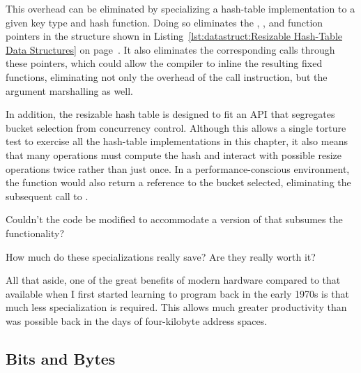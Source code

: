 This overhead can be eliminated by specializing a hash-table implementation
to a given key type and hash function.
Doing so eliminates the , , and
 function pointers in the  structure shown in
Listing~\ref{lst:datastruct:Resizable Hash-Table Data Structures} on
page~\pageref{lst:datastruct:Resizable Hash-Table Data Structures}.
It also eliminates the corresponding calls through these pointers,
which could allow the compiler to inline the resulting fixed functions,
eliminating not only the overhead of the call instruction, but the
argument marshalling as well.

In addition, the resizable hash table is designed to fit an API
that segregates bucket selection from concurrency control.
Although this allows a single torture test to exercise all the hash-table
implementations in this chapter, it also means that many operations
must compute the hash and interact with possible resize operations twice
rather than just once.
In a performance-conscious environment, the 
function would also return a reference to the bucket selected, eliminating
the subsequent call to .

\QuickQuiz{}
	Couldn't the  code be modified to accommodate
	a version of  that subsumes the
	 functionality?
 \QuickQuizEnd

\QuickQuiz{}
	How much do these specializations really save?
	Are they really worth it?
 \QuickQuizEnd

All that aside, one of the great benefits of modern hardware compared
to that available when I first started learning to program back in
the early 1970s is that much less specialization is required.
This allows much greater productivity than was possible back in the
days of four-kilobyte address spaces.

\subsection{Bits and Bytes}
\label{sec:datastruct:Bits and Bytes}

